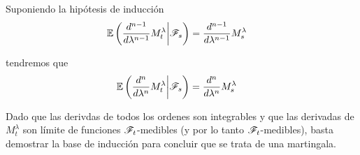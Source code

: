 Suponiendo la hipótesis de inducción
\begin{align}
    \mathbb{E}\left(\frac{d^{n-1}}{d \lambda^{n-1}} M_t^\lambda \bigg| \mathscr{F}_{s}\right) &= \frac{d^{n-1}}{d \lambda^{n-1}} M_s^\lambda
\end{align}

tendremos que
\begin{align}
    \mathbb{E}\left(\frac{d^n}{d \lambda^n} M_t^\lambda \bigg| \mathscr{F}_{s}\right)   &=    \frac{d^{n}}{d \lambda^{n}} M_s^\lambda
\end{align}\pn

Dado que las derivdas de todos los ordenes son integrables y que las derivadas de $M_t^\lambda$ son límite de funciones 
$\mathscr{F}_t$-medibles (y por lo tanto $\mathscr{F}_t$-medibles), basta demostrar la base de inducción para concluir que se trata de una martingala.\pn

